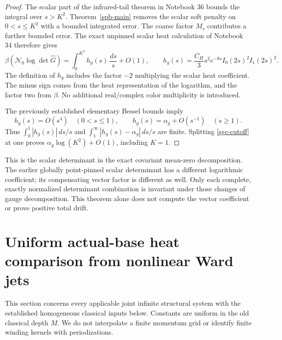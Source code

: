 \documentclass[11pt]{article}
\theoremstyle{remark}
\begin{document}
\begin{proof}
The scalar part of the infrared-tail theorem in Notebook 36 bounds
the integral over \(s>K^2\). Theorem~\ref{spb-main} removes the scalar
soft penalty on \(0<s\le K^2\) with a bounded integrated error.
The coarse factor \(M_s\) contributes a further bounded error.
The exact unpinned scalar heat calculation of Notebook 34 therefore
gives
\begin{equation}
 \beta(\mathcal N_0\log\det\widehat G)
       =\int_0^{K^2}h_g(s)\,\frac{ds}{s}+O(1),
 \qquad
 h_g(s)=\frac{C_H}{3}s^2e^{-8s}I_0(2s)^2I_1(2s)^2.
 \label{sgc-cutoff}
\end{equation}
The definition of \(h_g\) includes the factor \(-2\) multiplying
the scalar heat coefficient. The minus sign comes from the heat
representation of the logarithm, and the factor two from \(\beta\).
No additional real/complex color multiplicity is introduced.

The previously established elementary Bessel bounds imply
\[
 h_g(s)=O(s^4)\quad(0<s\le1),\qquad
 h_g(s)=\alpha_g+O(s^{-1})\quad(s\ge1).
 \]
Thus \(\int_0^1|h_g(s)|\,ds/s\) and
\(\int_1^\infty|h_g(s)-\alpha_g|\,ds/s\) are finite.
Splitting \eqref{sgc-cutoff} at one proves
\(\alpha_g\log(K^2)+O(1)\), including \(K=1\).
\end{proof}

This is the scalar determinant in the exact covariant mean-zero
decomposition. The earlier globally point-pinned scalar determinant
has a different logarithmic coefficient; its compensating vector
factor is different as well. Only each complete, exactly normalized
determinant combination is invariant under those changes of gauge
decomposition. This theorem alone does not compute the vector
coefficient or prove positive total drift.


\section{Uniform actual-base heat comparison from nonlinear Ward jets}
\label{abw-section}

This section concerns every applicable joint infinite structural system
with the established homogeneous classical inputs below. Constants are
uniform in the old classical depth \(M\). We do not interpolate a finite
momentum grid or identify finite winding kernels with periodizations.
\end{document}
